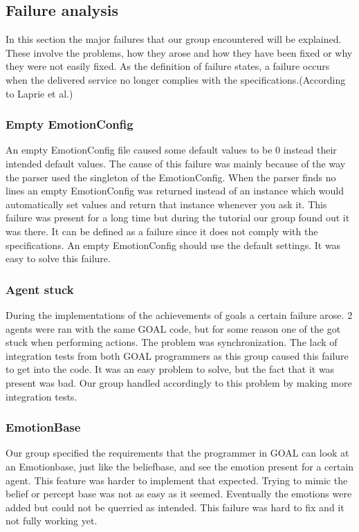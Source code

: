 \documentclass[11pt]{article}
\begin{document}
\subsection{Failure analysis}
In this section the major failures that our group encountered will be explained. These involve the problems, how they arose and how they have been fixed or why they were not easily fixed. As the definition of failure states, a failure occurs when the delivered service no longer complies with the specifications.(According to Laprie et al.)\cite{failure}

\subsubsection*{Empty EmotionConfig}
An empty EmotionConfig file caused some default values to be 0 instead their intended default values. The cause of this failure was mainly because of the way the parser used the singleton of the EmotionConfig. When the parser finds no lines an empty EmotionConfig was returned instead of an instance which would automatically set values and return that instance whenever you ask it. This failure was present for a long time but during the tutorial our group found out it was there. It can be defined as a failure since it does not comply with the specifications. An empty EmotionConfig should use the default settings. It was easy to solve this failure.

\subsubsection*{Agent stuck}
During the implementations of the achievements of goals a certain failure arose. 2 agents were ran with the same GOAL code, but for some reason one of the got stuck when performing actions. The problem was synchronization. The lack of integration tests from both GOAL programmers as this group caused this failure to get into the code. It was an easy problem to solve, but the fact that it was present was bad. Our group handled accordingly to this problem by making  more integration tests. 

\subsubsection*{EmotionBase}
Our group specified the requirements that the programmer in GOAL can look at an Emotionbase, just like the beliefbase, and see the emotion present for a certain agent. This feature was harder to implement that expected. Trying to mimic the belief or percept base was not as easy as it seemed. Eventually the emotions were added but could not be querried as intended. This failure was hard to fix and it not fully working yet. 
\end{document}
